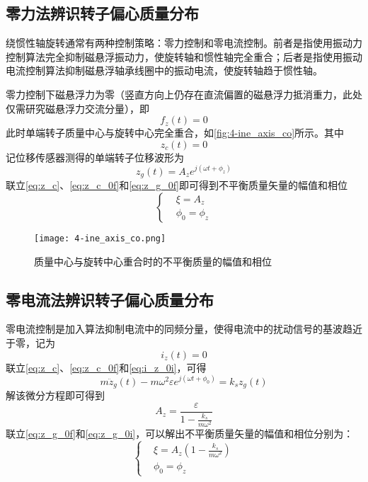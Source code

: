 \documentclass[
  lang=cn,
  degree=master,
  openany,oneside
]{nuaathesis}
\begin{document}
\subsection{零力法辨识转子偏心质量分布}

绕惯性轴旋转通常有两种控制策略：零力控制和零电流控制。前者是指使用振动力控制算法完全抑制磁悬浮振动力，使旋转轴和惯性轴完全重合；后者是指使用振动电流控制算法抑制磁悬浮轴承线圈中的振动电流，使旋转轴趋于惯性轴。

零力控制下磁悬浮力为零（竖直方向上仍存在直流偏置的磁悬浮力抵消重力，此处仅需研究磁悬浮力交流分量），即
\begin{equation}
	\label{eq:f_z_0f}
	f_z(t) = 0
\end{equation}
此时单端转子质量中心与旋转中心完全重合，如\autoref{fig:4-ine_axis_co}所示。其中
\begin{equation}
	\label{eq:z_c_0f}
	z_c(t) = 0
\end{equation}
记位移传感器测得的单端转子位移波形为
\begin{equation}
	\label{eq:z_g_0f}
	z_g(t) = A_ze^{j(\omega t + \phi _z)}
\end{equation}
联立\autoref{eq:z_c}、\autoref{eq:z_c_0f}和\autoref{eq:z_g_0f}即可得到不平衡质量矢量的幅值和相位
\begin{equation}
\left\{
\begin{aligned}
& \xi = A_z\\
& \phi _0 = \phi _z
\end{aligned}
\right.
\end{equation}

\begin{figure}[h!]
	\texttt{[image: 4-ine\_axis\_co.png]}
	\caption{质量中心与旋转中心重合时的不平衡质量的幅值和相位}
	\label{fig:4-ine_axis_co}
\end{figure}


\subsection{零电流法辨识转子偏心质量分布}

零电流控制是加入算法抑制电流中的同频分量，使得电流中的扰动信号的基波趋近于零，记为
\begin{equation}
	\label{eq:i_z_0i}
	i_z(t) = 0
\end{equation}
联立\autoref{eq:z_c}、\autoref{eq:z_c_0f}和\autoref{eq:i_z_0i}，可得
\begin{equation}
	\label{eq:0i_eq}
	m{\ddot{z}}_g(t) - m{\omega}^2\varepsilon e^{j (\omega t + \phi _0)} = k_sz_g(t) 
\end{equation}
解该微分方程即可得到
\begin{equation}
	\label{eq:z_g_0i}
	A_z = \frac{\varepsilon}{1-\frac{k_s}{m{\omega}^2}}
\end{equation}
联立\autoref{eq:z_g_0f}和\autoref{eq:z_g_0i}，可以解出不平衡质量矢量的幅值和相位分别为：
\begin{equation}
\label{eq:z_delta_0i}
\left\{
\begin{aligned}
& \xi = A_z\left( 1 -\frac{k_s}{m{\omega}^2} \right) \\
& \phi _0 = \phi _z
\end{aligned}
\right.
\end{equation}
\end{document}
